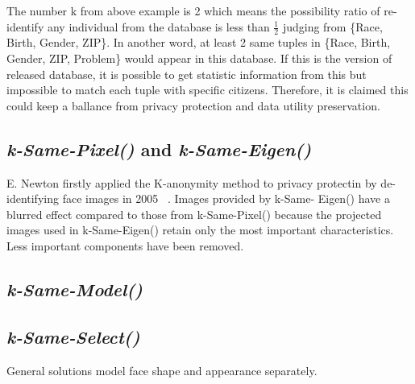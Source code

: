 		The number k from above example is 2 which means the possibility ratio of re-identify any individual from the database is less than $\frac{1}{2}$ judging from \{Race, Birth, Gender, ZIP\}. In another word, at least 2 same tuples in \{Race, Birth, Gender, ZIP, Problem\} would appear in this database. If this is the version of released database, it is possible to get statistic information from this but impossible to match each tuple with specific citizens. Therefore, it is claimed this could keep a ballance from privacy protection and data utility preservation.  
	
	\subsection{\emph{k-Same-Pixel()} and \emph{k-Same-Eigen()}}

	E. Newton firstly applied the K-anonymity method to privacy protectin by de-identifying face images in 2005 ~\cite{Newton05}. 
	Images provided by k-Same- Eigen() have a blurred effect compared to those from k-Same-Pixel() because the projected images used in k-Same-Eigen() retain only the most important characteristics. Less important components have been removed.
	\subsection{\emph{k-Same-Model()}}

	\subsection{\emph{k-Same-Select()}}
	
	General solutions model face shape and appearance separately. 